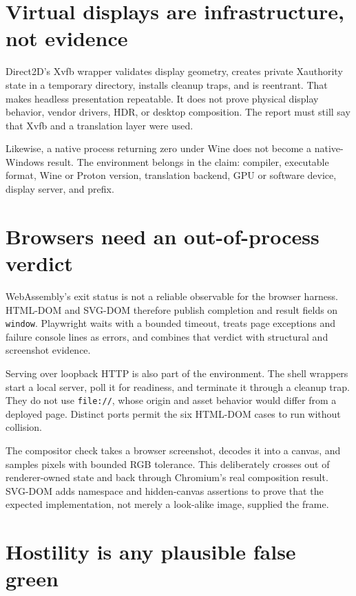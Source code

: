 \section{Virtual displays are infrastructure, not evidence}

Direct2D's Xvfb wrapper validates display geometry, creates private Xauthority state in a
temporary directory, installs cleanup traps, and is reentrant.  That makes headless presentation
repeatable.  It does not prove physical display behavior, vendor drivers, HDR, or desktop
composition.  The report must still say that Xvfb and a translation layer were used.

Likewise, a native process returning zero under Wine does not become a native-Windows result.
The environment belongs in the claim: compiler, executable format, Wine or Proton version,
translation backend, GPU or software device, display server, and prefix.

\section{Browsers need an out-of-process verdict}

WebAssembly's exit status is not a reliable observable for the browser harness.  HTML-DOM and
SVG-DOM therefore publish completion and result fields on \texttt{window}.  Playwright waits
with a bounded timeout, treats page exceptions and failure console lines as errors, and combines
that verdict with structural and screenshot evidence.

Serving over loopback HTTP is also part of the environment.  The shell wrappers start a local
server, poll it for readiness, and terminate it through a cleanup trap.  They do not use
\texttt{file://}, whose origin and asset behavior would differ from a deployed page.  Distinct
ports permit the six HTML-DOM cases to run without collision.

The compositor check takes a browser screenshot, decodes it into a canvas, and samples pixels
with bounded RGB tolerance.  This deliberately crosses out of renderer-owned state and back
through Chromium's real composition result.  SVG-DOM adds namespace and hidden-canvas assertions
to prove that the expected implementation, not merely a look-alike image, supplied the frame.

\section{Hostility is any plausible false green}

